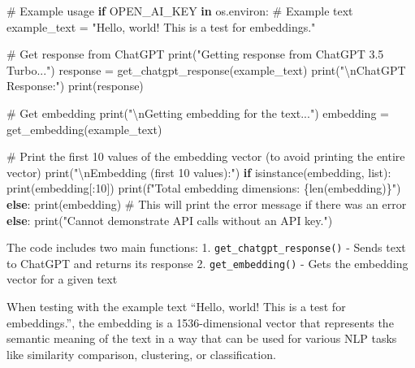 \documentclass[
  letterpaper,
  DIV=11,
  numbers=noendperiod]{scrartcl}
\newenvironment{Shaded}{\begin{snugshade}}{\end{snugshade}}
\newcommand{\BuiltInTok}[1]{\textcolor[rgb]{0.00,0.23,0.31}{#1}}
\newcommand{\CharTok}[1]{\textcolor[rgb]{0.13,0.47,0.30}{#1}}
\newcommand{\CommentTok}[1]{\textcolor[rgb]{0.37,0.37,0.37}{#1}}
\newcommand{\ControlFlowTok}[1]{\textcolor[rgb]{0.00,0.23,0.31}{\textbf{#1}}}
\newcommand{\DecValTok}[1]{\textcolor[rgb]{0.68,0.00,0.00}{#1}}
\newcommand{\KeywordTok}[1]{\textcolor[rgb]{0.00,0.23,0.31}{\textbf{#1}}}
\newcommand{\NormalTok}[1]{\textcolor[rgb]{0.00,0.23,0.31}{#1}}
\newcommand{\OperatorTok}[1]{\textcolor[rgb]{0.37,0.37,0.37}{#1}}
\newcommand{\SpecialCharTok}[1]{\textcolor[rgb]{0.37,0.37,0.37}{#1}}
\newcommand{\SpecialStringTok}[1]{\textcolor[rgb]{0.13,0.47,0.30}{#1}}
\newcommand{\StringTok}[1]{\textcolor[rgb]{0.13,0.47,0.30}{#1}}
\begin{document}
\begin{Shaded}
\begin{Highlighting}[]
\CommentTok{\# Example usage}
\ControlFlowTok{if} \StringTok{\textquotesingle{}OPEN\_AI\_KEY\textquotesingle{}} \KeywordTok{in}\NormalTok{ os.environ:}
    \CommentTok{\# Example text}
\NormalTok{    example\_text }\OperatorTok{=} \StringTok{"Hello, world! This is a test for embeddings."}
    
    \CommentTok{\# Get response from ChatGPT}
    \BuiltInTok{print}\NormalTok{(}\StringTok{"Getting response from ChatGPT 3.5 Turbo..."}\NormalTok{)}
\NormalTok{    response }\OperatorTok{=}\NormalTok{ get\_chatgpt\_response(example\_text)}
    \BuiltInTok{print}\NormalTok{(}\StringTok{"}\CharTok{\textbackslash{}n}\StringTok{ChatGPT Response:"}\NormalTok{)}
    \BuiltInTok{print}\NormalTok{(response)}
    
    \CommentTok{\# Get embedding}
    \BuiltInTok{print}\NormalTok{(}\StringTok{"}\CharTok{\textbackslash{}n}\StringTok{Getting embedding for the text..."}\NormalTok{)}
\NormalTok{    embedding }\OperatorTok{=}\NormalTok{ get\_embedding(example\_text)}
    
    \CommentTok{\# Print the first 10 values of the embedding vector (to avoid printing the entire vector)}
    \BuiltInTok{print}\NormalTok{(}\StringTok{"}\CharTok{\textbackslash{}n}\StringTok{Embedding (first 10 values):"}\NormalTok{)}
    \ControlFlowTok{if} \BuiltInTok{isinstance}\NormalTok{(embedding, }\BuiltInTok{list}\NormalTok{):}
        \BuiltInTok{print}\NormalTok{(embedding[:}\DecValTok{10}\NormalTok{])}
        \BuiltInTok{print}\NormalTok{(}\SpecialStringTok{f"Total embedding dimensions: }\SpecialCharTok{\{}\BuiltInTok{len}\NormalTok{(embedding)}\SpecialCharTok{\}}\SpecialStringTok{"}\NormalTok{)}
    \ControlFlowTok{else}\NormalTok{:}
        \BuiltInTok{print}\NormalTok{(embedding)  }\CommentTok{\# This will print the error message if there was an error}
\ControlFlowTok{else}\NormalTok{:}
    \BuiltInTok{print}\NormalTok{(}\StringTok{"Cannot demonstrate API calls without an API key."}\NormalTok{)}
\end{Highlighting}
\end{Shaded}

The code includes two main functions: 1.
\texttt{get\_chatgpt\_response()} - Sends text to ChatGPT and returns
its response 2. \texttt{get\_embedding()} - Gets the embedding vector
for a given text

When testing with the example text ``Hello, world! This is a test for
embeddings.'', the embedding is a 1536-dimensional vector that
represents the semantic meaning of the text in a way that can be used
for various NLP tasks like similarity comparison, clustering, or
classification.
\end{document}
